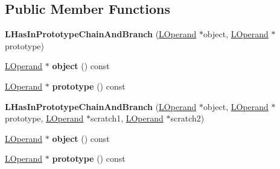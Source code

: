 \subsection*{Public Member Functions}
\begin{DoxyCompactItemize}
\item 
{\bfseries L\+Has\+In\+Prototype\+Chain\+And\+Branch} (\hyperlink{classv8_1_1internal_1_1_l_operand}{L\+Operand} $\ast$object, \hyperlink{classv8_1_1internal_1_1_l_operand}{L\+Operand} $\ast$prototype)\hypertarget{classv8_1_1internal_1_1_l_has_in_prototype_chain_and_branch_a986107e75af400f0ecb8ad0edc1d6c17}{}\label{classv8_1_1internal_1_1_l_has_in_prototype_chain_and_branch_a986107e75af400f0ecb8ad0edc1d6c17}

\item 
\hyperlink{classv8_1_1internal_1_1_l_operand}{L\+Operand} $\ast$ {\bfseries object} () const \hypertarget{classv8_1_1internal_1_1_l_has_in_prototype_chain_and_branch_a495e5c90fae5975c86c05b81abc64eb7}{}\label{classv8_1_1internal_1_1_l_has_in_prototype_chain_and_branch_a495e5c90fae5975c86c05b81abc64eb7}

\item 
\hyperlink{classv8_1_1internal_1_1_l_operand}{L\+Operand} $\ast$ {\bfseries prototype} () const \hypertarget{classv8_1_1internal_1_1_l_has_in_prototype_chain_and_branch_a064d5fd47ecfd5cadfaf5453641d0217}{}\label{classv8_1_1internal_1_1_l_has_in_prototype_chain_and_branch_a064d5fd47ecfd5cadfaf5453641d0217}

\item 
{\bfseries L\+Has\+In\+Prototype\+Chain\+And\+Branch} (\hyperlink{classv8_1_1internal_1_1_l_operand}{L\+Operand} $\ast$object, \hyperlink{classv8_1_1internal_1_1_l_operand}{L\+Operand} $\ast$prototype, \hyperlink{classv8_1_1internal_1_1_l_operand}{L\+Operand} $\ast$scratch1, \hyperlink{classv8_1_1internal_1_1_l_operand}{L\+Operand} $\ast$scratch2)\hypertarget{classv8_1_1internal_1_1_l_has_in_prototype_chain_and_branch_af9b94d7f0c12e5d9aced5e80097914ca}{}\label{classv8_1_1internal_1_1_l_has_in_prototype_chain_and_branch_af9b94d7f0c12e5d9aced5e80097914ca}

\item 
\hyperlink{classv8_1_1internal_1_1_l_operand}{L\+Operand} $\ast$ {\bfseries object} () const \hypertarget{classv8_1_1internal_1_1_l_has_in_prototype_chain_and_branch_a495e5c90fae5975c86c05b81abc64eb7}{}\label{classv8_1_1internal_1_1_l_has_in_prototype_chain_and_branch_a495e5c90fae5975c86c05b81abc64eb7}

\item 
\hyperlink{classv8_1_1internal_1_1_l_operand}{L\+Operand} $\ast$ {\bfseries prototype} () const \hypertarget{classv8_1_1internal_1_1_l_has_in_prototype_chain_and_branch_a064d5fd47ecfd5cadfaf5453641d0217}{}\label{classv8_1_1internal_1_1_l_has_in_prototype_chain_and_branch_a064d5fd47ecfd5cadfaf5453641d0217}


\end{DoxyCompactItemize}
